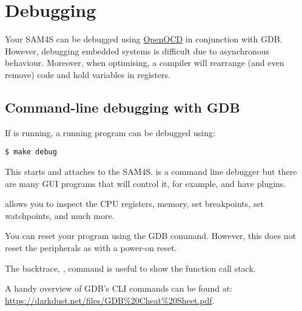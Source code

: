 \chapter{Debugging}
\label{debugging}

Your SAM4S can be debugged using \hyperref[OpenOCD]{OpenOCD} in
conjunction with GDB.  However, debugging embedded systems is
difficult due to asynchronous behaviour.  Moreover, when optimising, a
compiler will rearrange (and even remove) code and hold variables in
registers.

\section{Command-line debugging with GDB}

If  is running, a running program can be debugged using:

\begin{verbatim}
$ make debug
\end{verbatim}

This starts  and attaches to the SAM4S.  is
a command line debugger but there are many GUI programs that will
control it, for example,  and  have
plugins.

 allows you to inspect the CPU registers, memory, set
breakpoints, set watchpoints, and much more.

You can reset your program using the GDB  command.
However, this does not reset the peripherals as with a power-on reset.

The backtrace, , command is useful to show the function call
stack.

A handy overview of GDB's CLI commands can be found at:
\url{https://darkdust.net/files/GDB%20Cheat%20Sheet.pdf}.

